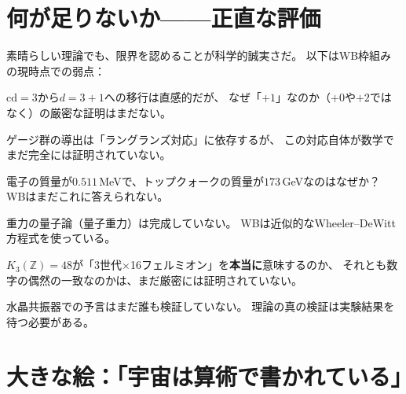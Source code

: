 \documentclass[12pt,a4paper]{article}
\begin{document}
\section{何が足りないか——正直な評価}

\begin{warnbox}[正直に認めること]
素晴らしい理論でも、限界を認めることが科学的誠実さだ。
以下はWB枠組みの現時点での弱点：
\end{warnbox}

\begin{warnbox}[限界1：「$+1$」はなぜ？]
$\mathrm{cd} = 3$から$d = 3+1$への移行は直感的だが、
なぜ「$+1$」なのか（$+0$や$+2$ではなく）の厳密な証明はまだない。
\end{warnbox}

\begin{warnbox}[限界2：ラングランズ予想は未完成]
ゲージ群の導出は「ラングランズ対応」に依存するが、
この対応自体が数学でまだ完全には証明されていない。
\end{warnbox}

\begin{warnbox}[限界3：フェルミオン質量の説明なし]
電子の質量が$0.511\,$MeVで、トップクォークの質量が$173\,$GeVなのはなぜか？
WBはまだこれに答えられない。
\end{warnbox}

\begin{warnbox}[限界4：量子重力が不完全]
重力の量子論（量子重力）は完成していない。
WBは近似的なWheeler--DeWitt方程式を使っている。
\end{warnbox}

\begin{warnbox}[限界5：$48 = 3\times 16$は偶然かもしれない]
$K_3(\mathbb{Z}) = 48$が「3世代$\times$16フェルミオン」を\textbf{本当に}意味するのか、
それとも数字の偶然の一致なのかは、まだ厳密には証明されていない。
\end{warnbox}

\begin{warnbox}[限界6：BAW実験はまだ行われていない]
水晶共振器での予言はまだ誰も検証していない。
理論の真の検証は実験結果を待つ必要がある。
\end{warnbox}

\section{大きな絵：「宇宙は算術で書かれている」}
\end{document}
